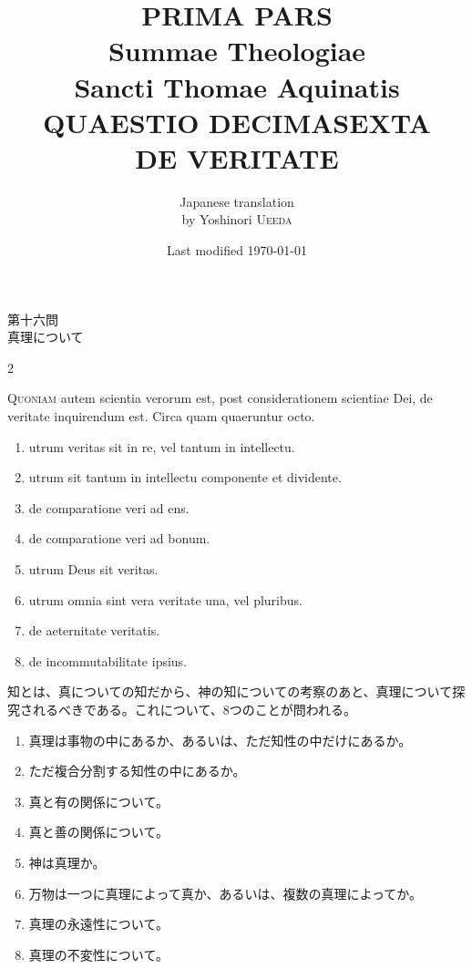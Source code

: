 \documentclass[paper=a4paper,fontsize=10pt,jafontsize=9pt,titlepage]{jlreq}
\title{{\bfseries PRIMA PARS}\\{\Huge Summae Theologiae}\\Sancti Thomae
Aquinatis\\{\sffamily QUAESTIO DECIMASEXTA}\\DE VERITATE}
\author{Japanese translation\\by Yoshinori {\scshape Ueeda}}
\date{Last modified \today}
\begin{document}
\maketitle
\pagestyle{fancy}

\begin{center}
{\Large 第十六問\\真理について}
\end{center}

\begin{paracol}{2}

{\huge Q}{\scshape uoniam} autem scientia verorum est, post
 considerationem scientiae Dei, de veritate inquirendum est. Circa quam
 quaeruntur octo. 
\begin{enumerate}
 \item utrum veritas sit in re, vel tantum in intellectu.
 \item utrum sit tantum in intellectu componente et dividente.
 \item de comparatione veri ad ens.
 \item de comparatione veri ad bonum.
 \item utrum Deus sit veritas.
 \item utrum omnia sint vera veritate una, vel pluribus.
 \item de aeternitate veritatis.
 \item de incommutabilitate ipsius.
\end{enumerate}

\switchcolumn

知とは、真についての知だから、神の知についての考察のあと、真理について探
 究されるべきである。これについて、8つのことが問われる。
\begin{enumerate}
 \item 真理は事物の中にあるか、あるいは、ただ知性の中だけにあるか。
 \item ただ複合分割する知性の中にあるか。
 \item 真と有の関係について。
 \item 真と善の関係について。
 \item 神は真理か。
 \item 万物は一つに真理によって真か、あるいは、複数の真理によってか。
 \item 真理の永遠性について。
 \item 真理の不変性について。
\end{enumerate}

\end{paracol}
\end{document}
